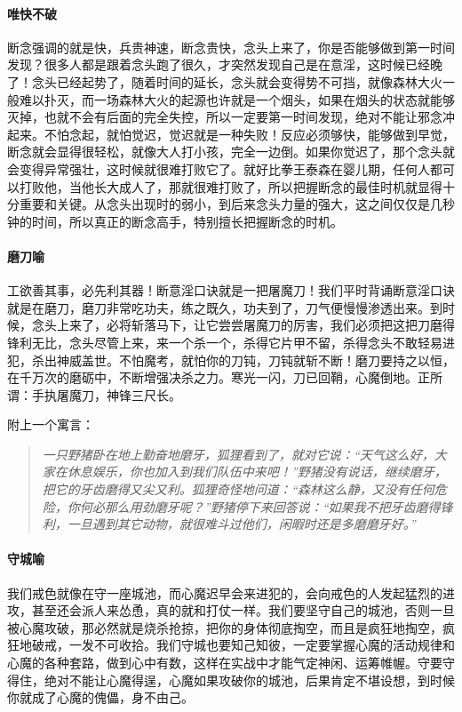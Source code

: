 \paragraph{唯快不破}

断念强调的就是快，兵贵神速，断念贵快，念头上来了，你是否能够做到第一时间发现？很多人都是跟着念头跑了很久，才突然发现自己是在意淫，这时候已经晚了！念头已经起势了，随着时间的延长，念头就会变得势不可挡，就像森林大火一般难以扑灭，而一场森林大火的起源也许就是一个烟头，如果在烟头的状态就能够灭掉，也就不会有后面的完全失控，所以一定要第一时间发现，绝对不能让邪念冲起来。不怕念起，就怕觉迟，觉迟就是一种失败！反应必须够快，能够做到早觉，断念就会显得很轻松，就像大人打小孩，完全一边倒。如果你觉迟了，那个念头就会变得异常强壮，这时候就很难打败它了。就好比拳王泰森在婴儿期，任何人都可以打败他，当他长大成人了，那就很难打败了，所以把握断念的最佳时机就显得十分重要和关键。从念头出现时的弱小，到后来念头力量的强大，这之间仅仅是几秒钟的时间，所以真正的断念高手，特别擅长把握断念的时机。

\paragraph{磨刀喻}

工欲善其事，必先利其器！断意淫口诀就是一把屠魔刀！我们平时背诵断意淫口诀就是在磨刀，磨刀非常吃功夫，练之既久，功夫到了，刀气便慢慢渗透出来。到时候，念头上来了，必将斩落马下，让它尝尝屠魔刀的厉害，我们必须把这把刀磨得锋利无比，念头尽管上来，来一个杀一个，杀得它片甲不留，杀得念头不敢轻易进犯，杀出神威盖世。不怕魔考，就怕你的刀钝，刀钝就斩不断！磨刀要持之以恒，在千万次的磨砺中，不断增强决杀之力。寒光一闪，刀已回鞘，心魔倒地。正所谓：手执屠魔刀，神锋三尺长。

附上一个寓言：

\begin{quote}\it
    一只野猪卧在地上勤奋地磨牙，狐狸看到了，就对它说：“天气这么好，大家在休息娱乐，你也加入到我们队伍中来吧！”野猪没有说话，继续磨牙，把它的牙齿磨得又尖又利。狐狸奇怪地问道：“森林这么静，又没有任何危险，你何必那么用劲磨牙呢？”野猪停下来回答说：“如果我不把牙齿磨得锋利，一旦遇到其它动物，就很难斗过他们，闲暇时还是多磨磨牙好。”
\end{quote}


\paragraph{守城喻}

我们戒色就像在守一座城池，而心魔迟早会来进犯的，会向戒色的人发起猛烈的进攻，甚至还会派人来怂恿，真的就和打仗一样。我们要坚守自己的城池，否则一旦被心魔攻破，那必然就是烧杀抢掠，把你的身体彻底掏空，而且是疯狂地掏空，疯狂地破戒，一发不可收拾。我们守城也要知己知彼，一定要掌握心魔的活动规律和心魔的各种套路，做到心中有数，这样在实战中才能气定神闲、运筹帷幄。守要守得住，绝对不能让心魔得逞，心魔如果攻破你的城池，后果肯定不堪设想，到时候你就成了心魔的傀儡，身不由己。

